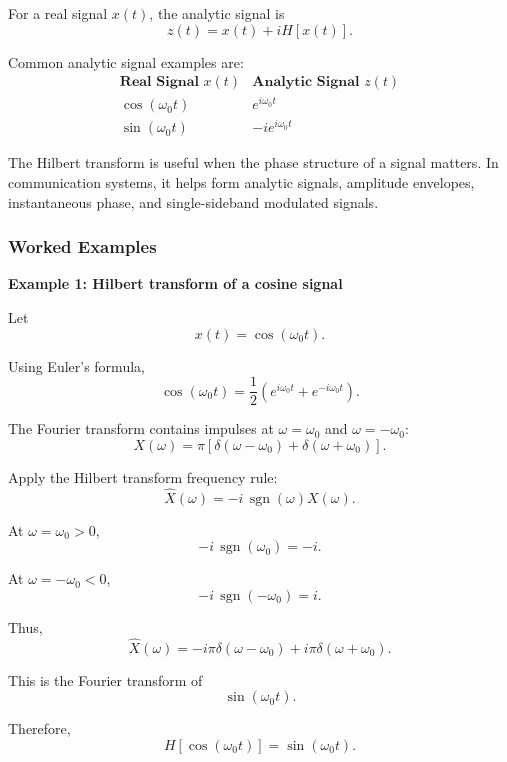\begin{conceptbox}
    For a real signal $x(t)$, the analytic signal is
    \[
        z(t)=x(t)+iH[x(t)].
    \]

    Common analytic signal examples are:
    \[
        \begin{array}{c|c}
            \textbf{Real Signal } x(t) & \textbf{Analytic Signal } z(t) \\ \hline
            \cos(\omega_0t)            & e^{i\omega_0t}                 \\[6pt]
            \sin(\omega_0t)            & -ie^{i\omega_0t}
        \end{array}
    \]
\end{conceptbox}

\begin{noteBox}
    The Hilbert transform is useful when the phase structure of a signal matters. In communication systems, it helps form analytic signals, amplitude envelopes, instantaneous phase, and single-sideband modulated signals.
\end{noteBox}

\subsubsection*{Worked Examples}

\begin{examplebox}
    \textbf{Example 1: Hilbert transform of a cosine signal}

    Let
    \[
        x(t)=\cos(\omega_0t).
    \]

    Using Euler's formula,
    \[
        \cos(\omega_0t)
        =
        \frac{1}{2}
        \left(e^{i\omega_0t}+e^{-i\omega_0t}\right).
    \]

    The Fourier transform contains impulses at $\omega=\omega_0$ and $\omega=-\omega_0$:
    \[
        X(\omega)=\pi\left[\delta(\omega-\omega_0)+\delta(\omega+\omega_0)\right].
    \]

    Apply the Hilbert transform frequency rule:
    \[
        \widehat{X}(\omega)
        =
        -i\,\operatorname{sgn}(\omega)X(\omega).
    \]

    At $\omega=\omega_0>0$,
    \[
        -i\,\operatorname{sgn}(\omega_0)=-i.
    \]

    At $\omega=-\omega_0<0$,
    \[
        -i\,\operatorname{sgn}(-\omega_0)=i.
    \]

    Thus,
    \[
        \widehat{X}(\omega)
        =
        -i\pi\delta(\omega-\omega_0)
        +
        i\pi\delta(\omega+\omega_0).
    \]

    This is the Fourier transform of
    \[
        \sin(\omega_0t).
    \]

    Therefore,
    \[
        \boxed{
            H[\cos(\omega_0t)] = \sin(\omega_0t)
        }.
    \]
\end{examplebox}

